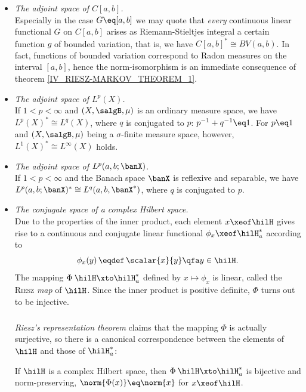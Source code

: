 \documentclass[11pt,twoside]{article}
\def\G{G}
\begin{document}
\begin{itemize}[leftmargin=12pt,itemsep=5pt]
\item[3.] \textit{The adjoint space of $C[a,b]$.}\\
Especially in the case $\G \eq [a,b]$ we may quote
that \textit{every} continuous linear functional $G$ on $C[a,b]$ arises
as Riemann-Stieltjes integral
{\wrt} a certain function $g$ of bounded variation,
that is,
we have $C[a,b]^* \cong BV(a,b)$.
In fact,
functions of bounded variation correspond to Radon measures
on the interval $[a,b]$,
hence the norm-isomorphism is an immediate consequence
of theorem \ref{IV_RIESZ-MARKOV_THEOREM_1}.

\item[4.] \textit{The adjoint space of $L^p(X)$.}\\
If $1 < p <\infty$ and $(X,\salgB,\mu)$ is an ordinary measure space,
we have $L^p(X)^* \cong L^q(X)$,
where $q$ is conjugated to $p$:
$p^{-1} + q^{-1} \eq 1$.
For $p \eq 1$ and $(X,\salgB,\mu)$ being a $\sigma$-finite measure space,
however,
$L^1(X)^* \cong L^{\infty}(X)$ holds.

\item[5.] \textit{The adjoint space of $L^p(a,b;\banX)$.}\\
If $1 < p <\infty$ and the Banach space $\banX$ is reflexive and separable,
we have $L^p(a,b;\banX)^* \cong L^q(a,b,\banX^*)$,
where $q$ is conjugated to $p$.

\item[6.] \textit{The conjugate space of a complex Hilbert space.}\\
Due to the properties of the inner product,
each element $x \xeof \hilH$ gives rise to
a continuous and conjugate linear functional $\phi_x \xeof \hilH_a^*$
according to
\[
\phi_x(y) \, \eqdef \, \scalar{x}{y} \qfa y \in \hilH.
\]
The mapping $\Phi\:\hilH \xto \hilH_a^*$ defined by $x \mapsto \phi_x$
is linear,
called the \textsc{Riesz} \textit{map} of $\hilH$.
Since the inner product is positive definite,
$\Phi$ turns out to be injective.

\subparagraph{} %
\textit{Riesz}\textit{'s representation theorem} claims
that the mapping $\Phi$ is actually surjective,
so there is a canonical correspondence
between the elements of $\hilH$ and those of $\hilH_a^*$:

\begin{theorem1}\label{IV_RIESZ_REPRESENTATION_THEOREM}
If $\hilH$ is a complex Hilbert space,
then $\Phi\: \hilH \xto \hilH_a^*$ is bijective and norm-preserving,
{\ie}
$\norm{\Phi(x)} \eq \norm{x}$ for $x \xeof \hilH$.
\end{theorem1}


\end{itemize}
\end{document}
